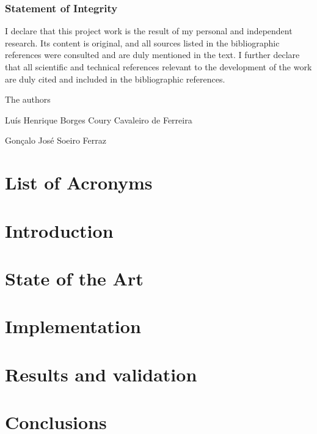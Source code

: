 \documentclass [11pt,twoside]{report}  %
\begin{document}
\clearpage



\vspace*{\fill}
\begin{center}
\subsection*{Statement of Integrity}
\end{center}

I declare that this project work is the result of my personal
and independent research. Its content is original, and all sources listed in the bibliographic references
were consulted and are duly mentioned in the text. I further declare that all scientific and technical
references relevant to the development of the work are duly cited and included in the bibliographic
references.

\vspace{10mm}

\begin{center}
    The authors
\end{center}

\begin{center}
    Luís Henrique Borges Coury Cavaleiro de Ferreira
    \par
    Gonçalo José Soeiro Ferraz
    \par
\end{center}
\vspace*{\fill}
\clearpage


\tableofcontents 
\listoftables
\listoffigures

\chapter*{List of Acronyms}		%
		
\clearpage 


\chapter{Introduction}



\chapter{State of the Art}



\chapter{Implementation}


\chapter{Results and validation}



\chapter{Conclusions}



\nocite{*}
\typeout{}
\printbibliography 
\end{document}
